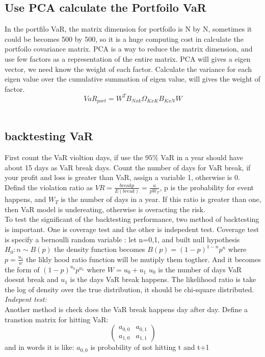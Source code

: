 \documentclass[a4paper,11pt]{article}
\begin{document}
\subsection{Use PCA calculate the Portfoilo VaR}
In the portfilo VaR, the matrix dimension for portfoilo is N by N, sometimes it could be becomes 500 by 500, so it is a huge computing cost in calculate the portfoilo covariance matrix. PCA is a way to reduce the matrix dimension, and use few factors as a representation of the entire matrix. PCA will gives a eigen vector, we need know the weight of each factor. Calculate the variance for each eigen value over the cumulative summation of eigen value, will gives the weight of factor.
$$ VaR_{port}=W^T B_{Nxk}  \Omega_{KxK}  B_{KxN}  W $$\\
\subsection{backtesting VaR}
First count the VaR violtion days, if use the $95\% $ VaR in a year should have about 15 days as VaR break days. Count the number of days for VaR break, if your profit and loss is greater than VaR, assign a variable 1, otherwise is 0. Defind the violation ratio as $VR=\frac{breakp}{E(break)}=\frac{u}{p W_T}$, p is the probability for event happens, and $W_T$ is the number of days in a year. If this ratio is greater than one, then VaR model is undereating, otherwise is overacting the risk.\\
To test the significant of the backtesting performance, two method of backtesting is important. One is coverage test and the other is indepedent test. Coverage test is specify a bernoulli random variable :
let n=0,1, and built null hypothesis $H_0: n \sim B(p)$ the density function becomes $ B(p)=(1-p)^{1-n}p^{n}$ where $p=\frac{u_1}{w}$ the likly hood ratio function will be mutiply them togther. And it becomes the form of $(1-p)^{u_0} p^{u_1}$ where $W=u_0+u_1$ $u_0$ is the number of days VaR doesnt break and $u_1$ is the days VaR break happens. The likelihood ratio is take the log of density over the true distribution, it should be chi-square distributed.\\
{\em Indepent test:}\\
Another method is check does the VaR break happens day after day. Define a transtion matrix for hitting VaR:
$$
\begin{pmatrix}
a_{0,0} & a_{0,1} \\
a_{1,0} & a_{1,1}
\end{pmatrix}
$$
and in words it is like: $a_{0,0}$ is probability of not hitting t and t+1\\
\end{document}
